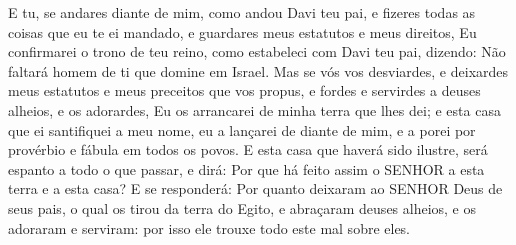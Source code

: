 {E tu, se andares diante de mim, como andou Davi teu pai, e fizeres todas as coisas que eu te ei mandado, e guardares meus estatutos e meus direitos,
Eu confirmarei o trono de teu reino, como estabeleci com Davi teu pai, dizendo: Não faltará homem de ti que domine em Israel.
Mas se vós vos desviardes, e deixardes meus estatutos e meus preceitos que vos propus, e fordes e servirdes a deuses alheios, e os adorardes,
Eu os arrancarei de minha terra que lhes dei; e esta casa que ei santifiquei a meu nome, eu a lançarei de diante de mim, e a porei por provérbio e fábula em todos os povos.
E esta casa que haverá sido ilustre, será espanto a todo o que passar, e dirá: Por que há feito assim o SENHOR a esta terra e a esta casa?
E se responderá: Por quanto deixaram ao SENHOR Deus de seus pais, o qual os tirou da terra do Egito, e abraçaram deuses alheios, e os adoraram e serviram: por isso ele trouxe todo este mal sobre eles.

}
